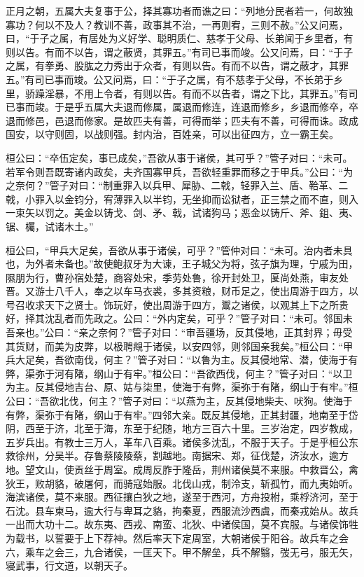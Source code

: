 \documentclass[]{article}
\begin{document}
正月之朝，五属大夫复事于公，择其寡功者而谯之曰：``列地分民者若一，何故独寡功？何以不及人？教训不善，政事其不治，一再则宥，三则不赦。''公又问焉，曰，``于子之属，有居处为义好学、聪明质仁、慈孝于父母、长弟闻于乡里者，有则以告。有而不以告，谓之蔽贤，其罪五。''有司已事而竣。公又问焉，曰：``于子之属，有拳勇、股肱之力秀出于众者，有则以告。有而不以告，谓之蔽才，其罪五。''有司已事而竣。公又问焉，曰：``于子之属，有不慈孝于父母，不长弟于乡里，骄躁淫暴，不用上令者，有则以告。有而不以告者，谓之下比，其罪五。''有司已事而竣。于是乎五属大夫退而修属，属退而修连，连退而修乡，乡退而修卒，卒退而修邑，邑退而修家。是故匹夫有善，可得而举；匹夫有不善，可得而诛。政成国安，以守则固，以战则强。封内治，百姓亲，可以出征四方，立一霸王矣。

桓公曰：``卒伍定矣，事已成矣，''吾欲从事于诸侯，其可乎？''管子对曰：``未可。若军令则吾既寄诸内政矣，夫齐国寡甲兵，吾欲轻重罪而移之于甲兵。''公曰：``为之奈何？''管子对曰：``制重罪入以兵甲、犀胁、二戟，轻罪入兰、盾、鞈革、二戟，小罪入以金钧分，宥薄罪入以半钧，无坐抑而讼狱者，正三禁之而不直，则入一束矢以罚之。美金以铸戈、剑、矛、戟，试诸狗马；恶金以铸斤、斧、鉏、夷、锯、欘，试诸木土。''

桓公曰，``甲兵大足矣，吾欲从事于诸侯，可乎？''管仲对曰：``未可。治内者未具也，为外者未备也。''故使鲍叔牙为大谏，王子城父为将，弦子旗为理，宁戚为田，隰朋为行，曹孙宿处楚，商容处宋，季劳处鲁，徐开封处卫，匽尚处燕，审友处晋。又游士八千人，奉之以车马衣裘，多其资粮，财币足之，使出周游于四方，以号召收求天下之贤士。饰玩好，使出周游于四方，鬻之诸侯，以观其上下之所贵好，择其沈乱者而先政之。公曰：``外内定矣，可乎？''管子对曰：``未可。邻国未吾亲也。''公曰：``亲之奈何？''管子对曰：``审吾疆场，反其侵地，正其封界；毋受其货财，而美为皮弊，以极聘覜于诸侯，以安四邻，则邻国亲我矣。''桓公曰：``甲兵大足矣，吾欲南伐，何主？''管子对曰：``以鲁为主。反其侵地常、潜，使海于有弊，渠弥于河有陼，纲山于有牢。''桓公曰：``吾欲西伐，何主？''管子对曰：``以卫为主。反其侵地吉台、原、姑与柒里，使海于有弊，渠弥于有陼，纲山于有牢。''桓公曰：``吾欲北伐，何主？''管子对曰：``以燕为主，反其侵地柴夫、吠狗。使海于有弊，渠弥于有陼，纲山于有牢。''四邻大亲。既反其侵地，正其封疆，地南至于岱阴，西至于济，北至于海，东至于纪随，地方三百六十里。三岁治定，四岁教成，五岁兵出。有教士三万人，革车八百乘。诸侯多沈乱，不服于天子。于是乎桓公东救徐州，分吴半。存鲁蔡陵陵蔡，割越地。南据宋、郑，征伐楚，济汝水，逾方地。望文山，使贡丝于周室。成周反胙于隆岳，荆州诸侯莫不来服。中救晋公，禽狄王，败胡貉，破屠何，而骑寇始服。北伐山戎，制泠支，斩孤竹，而九夷始听。海滨诸侯，莫不来服。西征攘白狄之地，遂至于西河，方舟投柎，乘桴济河，至于石沈。县车柬马，逾大行与卑耳之貉，拘秦夏，西服流沙西虞，而秦戎始从。故兵一出而大功十二。故东夷、西戎、南蛮、北狄、中诸侯国，莫不宾服。与诸侯饰牲为载书，以誓要于上下荐神。然后率天下定周室，大朝诸侯于阳谷。故兵车之会六，乘车之会三，九合诸侯，一匡天下。甲不解垒，兵不解翳，弢无弓，服无矢，寝武事，行文道，以朝天子。
\end{document}
